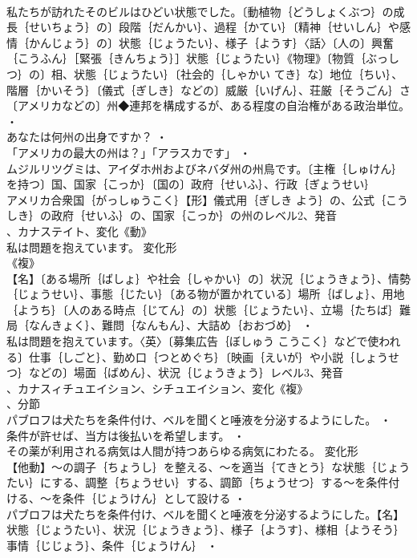 \documentclass[8pt]{extreport}
\begin{document}
\begin{CJK}{UTF8}{min}
\\	私たちが訪れたそのビルはひどい状態でした。〔動植物｛どうしょくぶつ｝の成長｛せいちょう｝の〕段階｛だんかい｝、過程｛かてい｝〔精神｛せいしん｝や感情｛かんじょう｝の〕状態｛じょうたい｝、様子｛ようす｝〈話〉〔人の〕興奮｛こうふん｝［緊張｛きんちょう｝］状態｛じょうたい｝《物理》〔物質｛ぶっしつ｝の〕相、状態｛じょうたい｝〔社会的｛しゃかい てき｝な〕地位｛ちい｝、階層｛かいそう｝〔儀式｛ぎしき｝などの〕威厳｛いげん｝、荘厳｛そうごん｝さ〔アメリカなどの〕州◆連邦を構成するが、ある程度の自治権がある政治単位。 ・
\\	あなたは何州の出身ですか？ ・
\\	「アメリカの最大の州は？」「アラスカです」 ・
\\	ムジルリツグミは、アイダホ州およびネバダ州の州鳥です。〔主権｛しゅけん｝を持つ〕国、国家｛こっか｝〔国の〕政府｛せいふ｝、行政｛ぎょうせい｝
\\	アメリカ合衆国｛がっしゅうこく｝【形】儀式用｛ぎしき よう｝の、公式｛こうしき｝の政府｛せいふ｝の、国家｛こっか｝の州のレベル2、発音
\\	、カナステイト、変化《動》
\\	私は問題を抱えています。	変化形 
\\	《複》
\\	【名】〔ある場所｛ばしょ｝や社会｛しゃかい｝の〕状況｛じょうきょう｝、情勢｛じょうせい｝、事態｛じたい｝〔ある物が置かれている〕場所｛ばしょ｝、用地｛ようち｝〔人のある時点｛じてん｝の〕状態｛じょうたい｝、立場｛たちば｝難局｛なんきょく｝、難問｛なんもん｝、大詰め｛おおづめ｝ ・
\\	私は問題を抱えています。〈英〉〔募集広告｛ぼしゅう こうこく｝などで使われる〕仕事｛しごと｝、勤め口｛つとめぐち｝〔映画｛えいが｝や小説｛しょうせつ｝などの〕場面｛ばめん｝、状況｛じょうきょう｝レベル3、発音
\\	、カナスィチュエイション、シチュエイション、変化《複》
\\	、分節
\\	パブロフは犬たちを条件付け、ベルを聞くと唾液を分泌するようにした。 ・
\\	条件が許せば、当方は後払いを希望します。 ・
\\	その薬が利用される病気は人間が持つあらゆる病気にわたる。	変化形 
\\	【他動】～の調子｛ちょうし｝を整える、～を適当｛てきとう｝な状態｛じょうたい｝にする、調整｛ちょうせい｝する、調節｛ちょうせつ｝する～を条件付ける、～を条件｛じょうけん｝として設ける ・
\\	パブロフは犬たちを条件付け、ベルを聞くと唾液を分泌するようにした。【名】状態｛じょうたい｝、状況｛じょうきょう｝、様子｛ようす｝、様相｛ようそう｝事情｛じじょう｝、条件｛じょうけん｝ ・

\end{CJK}
\end{document}
